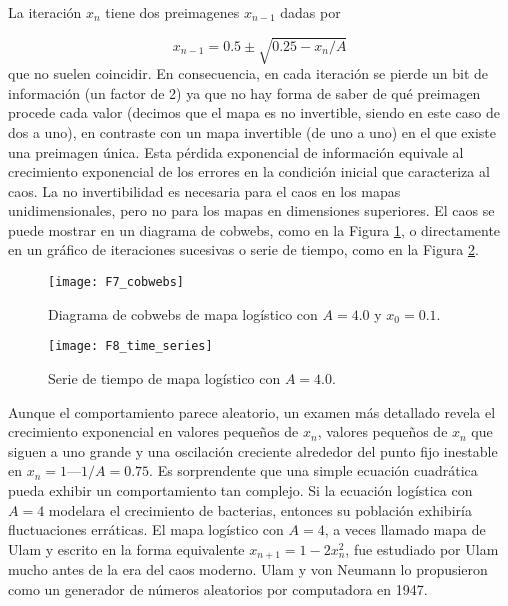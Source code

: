 \begin{itemize}
                    La iteración $x_{n}$ tiene dos preimagenes $x_{n-1}$ dadas por

                    \begin{equation}
                        x_{n-1} = 0.5 \pm \sqrt{0.25 - x_{n}/A} 
                    \end{equation}
                    que no suelen coincidir. En consecuencia, en cada iteración se pierde un bit de información (un factor de 2) ya que no hay forma de saber de qué preimagen procede cada valor (decimos que el mapa es no invertible, siendo en este caso de dos a uno), en contraste con un mapa invertible (de uno a uno) en el que existe una preimagen única. Esta pérdida exponencial de información equivale al crecimiento exponencial de los errores en la condición inicial que caracteriza al caos. La no invertibilidad es necesaria para el caos en los mapas unidimensionales, pero no para los mapas en dimensiones superiores. El caos se puede mostrar en un diagrama de cobwebs, como en la Figura \ref{fig:F7_cobwebs}, o directamente en un gráfico de iteraciones sucesivas o serie de tiempo, como en la Figura \ref{fig:F8_time_series}.

                    \begin{figure}[hbtp]
                        \centering
                        \texttt{[image: F7\_cobwebs]}
                        \caption{Diagrama de cobwebs de mapa logístico con $A = 4.0$ y $x_{0} = 0.1$.}
                        \label{fig:F7_cobwebs}
                    \end{figure}

                    \begin{figure}[hbtp]
                        \centering
                        \texttt{[image: F8\_time\_series]}
                        \caption{Serie de tiempo de mapa logístico con $A = 4.0$.}
                        \label{fig:F8_time_series}
                    \end{figure}

                    Aunque el comportamiento parece aleatorio, un examen más detallado revela el crecimiento exponencial en valores pequeños de $x_{n}$, valores pequeños de $x_{n}$ que siguen a uno grande y una oscilación creciente alrededor del punto fijo inestable en $x_{n} = 1 — 1/A = 0.75$. Es sorprendente que una simple ecuación cuadrática pueda exhibir un comportamiento tan complejo. Si la ecuación logística con $A = 4$ modelara el crecimiento de bacterias, entonces su población exhibiría fluctuaciones erráticas. El mapa logístico con $A = 4$, a veces llamado mapa de Ulam y escrito en la forma equivalente $x_{n+1} = 1 - 2 x_{n}^{2}$, fue estudiado por Ulam mucho antes de la era del caos moderno. Ulam y von Neumann lo propusieron como un generador de números aleatorios por computadora en 1947.


\end{itemize}
